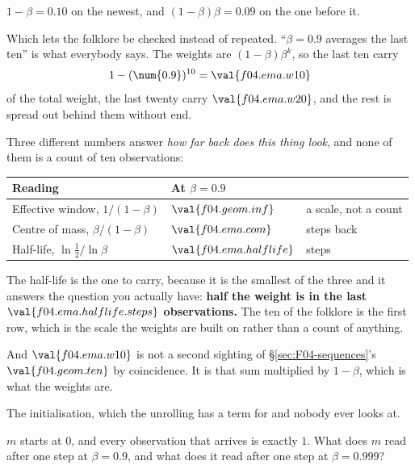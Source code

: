 \begin{fr}
\begin{ansblock}
$1 - \beta = \num{0.10}$ on the newest, and $(1-\beta)\beta = \num{0.09}$ on
the one before it.
\end{ansblock}

Which lets the folklore be checked instead of repeated.
\enquote{$\beta = \num{0.9}$ averages the last ten} is what everybody says.
The weights are $(1-\beta)\beta^{k}$, so the last ten carry
\[ 1 - (\num{0.9})^{10} = \val{f04.ema.w10} \]
of the total weight, the last twenty carry $\val{f04.ema.w20}$, and the rest
is spread out behind them without end.

Three different numbers answer \emph{how far back does this thing look}, and
none of them is a count of ten observations:

\begin{center}
\begin{tabular}{lll}
\toprule
Reading & At $\beta = \num{0.9}$ & \\
\midrule
Effective window, $1/(1-\beta)$ & $\val{f04.geom.inf}$ & a scale, not a count \\
Centre of mass, $\beta/(1-\beta)$ & $\val{f04.ema.com}$ & steps back \\
Half-life, $\ln \frac{1}{2} / \ln \beta$ & $\val{f04.ema.halflife}$ & steps \\
\bottomrule
\end{tabular}
\end{center}

The half-life is the one to carry, because it is the smallest of the three and
it answers the question you actually have: \textbf{half the weight is in the
last $\val{f04.ema.halflife.steps}$ observations.} The ten of the folklore is
the first row, which is the scale the weights are built on rather than a count
of anything.

And $\val{f04.ema.w10}$ is not a second sighting of
\S\ref{sec:F04-sequences}'s $\val{f04.geom.ten}$ by coincidence. It is that
sum multiplied by $1 - \beta$, which is what the weights are.
\end{fr}


\begin{fr}
\yourturn
The initialisation, which the unrolling has a term for and nobody ever looks
at.

$m$ starts at $0$, and every observation that arrives is exactly $1$. What
does $m$ read after one step at $\beta = \num{0.9}$, and what does it read
after one step at $\beta = \num{0.999}$?
\dotline
\nextframe
\end{fr}

